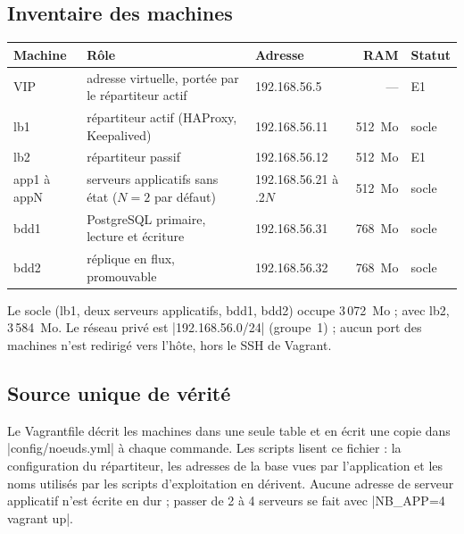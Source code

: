 \documentclass[a4paper,11pt]{article}
\begin{document}
\subsection{Inventaire des machines}

\begin{center}\small
\begin{tabular}{@{}L{2.4cm}L{5.4cm}L{3.3cm}rl@{}}
\toprule
\textbf{Machine} & \textbf{Rôle} & \textbf{Adresse} & \textbf{RAM} & \textbf{Statut}\\
\midrule
VIP & adresse virtuelle, portée par le répartiteur actif & 192.168.56.5 & --- & E1\\
lb1 & répartiteur actif (HAProxy, Keepalived) & 192.168.56.11 & 512~Mo & socle\\
lb2 & répartiteur passif & 192.168.56.12 & 512~Mo & E1\\
app1 à appN & serveurs applicatifs sans état ($N=2$ par défaut) & 192.168.56.21 à .2$N$ & 512~Mo & socle\\
bdd1 & PostgreSQL primaire, lecture et écriture & 192.168.56.31 & 768~Mo & socle\\
bdd2 & réplique en flux, promouvable & 192.168.56.32 & 768~Mo & socle\\
\bottomrule
\end{tabular}
\end{center}

Le socle (lb1, deux serveurs applicatifs, bdd1, bdd2) occupe 3\,072~Mo ; avec lb2, 3\,584~Mo. Le réseau privé est |192.168.56.0/24| (groupe~1) ; aucun port des machines n'est redirigé vers l'hôte, hors le SSH de Vagrant.

\subsection{Source unique de vérité}

Le Vagrantfile décrit les machines dans une seule table et en écrit une copie dans |config/noeuds.yml| à chaque commande. Les scripts lisent ce fichier : la configuration du répartiteur, les adresses de la base vues par l'application et les noms utilisés par les scripts d'exploitation en dérivent. Aucune adresse de serveur applicatif n'est écrite en dur ; passer de 2 à 4 serveurs se fait avec |NB_APP=4 vagrant up|.
\end{document}
